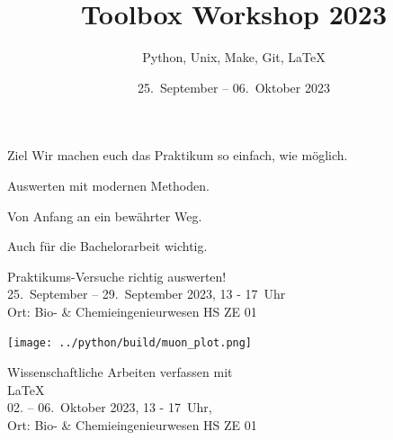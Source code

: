 

\title[Toolbox 2023]{Toolbox Workshop 2023}
\subtitle{Python, Unix, Make, Git, \LaTeX{}}
\date{25.~September – 06.~Oktober 2023}
\author[Toolbox Workshop Team]{}



\maketitle

\begin{frame}{Ziel}
  \setlength\parskip{3ex}
  \huge
  Wir machen euch das Praktikum so einfach, wie möglich.

  Auswerten mit modernen Methoden.

  Von Anfang an ein bewährter Weg.

  Auch für die Bachelorarbeit wichtig.
\end{frame}

\begin{frame}
  \vspace{0.7cm}
  \begin{center}
    \huge Praktikums-Versuche richtig auswerten!\\
    25.~September – 29.~September 2023, 13 - 17~Uhr\\%
    Ort: Bio- \& Chemieingenieurwesen HS ZE 01 %
  \end{center}
\end{frame}

\begin{frame}[plain]
  \texttt{[image: ../python/build/muon\_plot.png]}
\end{frame}

\begin{frame}
  \begin{center}
    \huge Wissenschaftliche Arbeiten verfassen mit \\[0.5\baselineskip]
    \textrm{\fontsize{80}{120}\selectfont\LaTeX{}}\\[0.5\baselineskip]
    02. – 06.~Oktober 2023, 13 - 17~Uhr,\\
    Ort: Bio- \& Chemieingenieurwesen HS ZE 01%
  \end{center}
\end{frame}

